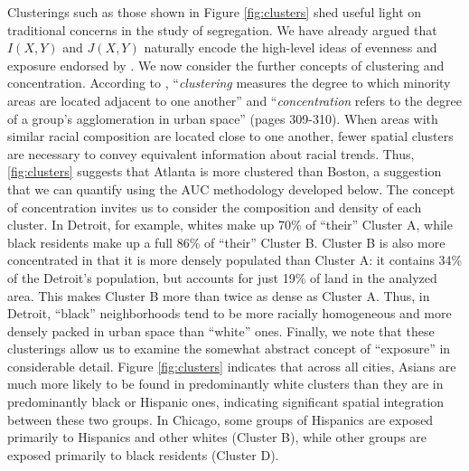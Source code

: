 	Clusterings such as those shown in Figure \ref{fig:clusters} shed useful light on traditional concerns in the study of segregation. We have already argued that $I(X,Y)$ and $J(X,Y)$ naturally encode the high-level ideas of evenness and exposure endorsed by \cite{Reardon2004}. We now consider the further concepts of clustering and concentration. According to \cite{Press2009a}, ``\emph{clustering} measures the degree to which minority areas are located adjacent to one another'' and ``\emph{concentration} refers to the degree of a group's agglomeration in urban space'' (pages 309-310). When areas with similar racial composition are located close to one another, fewer spatial clusters are necessary to convey equivalent information about racial trends. Thus, \ref{fig:clusters} suggests that Atlanta is more clustered than Boston, a suggestion that we can quantify using the AUC methodology developed below. The concept of concentration invites us to consider the composition and density of each cluster. In Detroit, for example, whites make up 70\% of ``their'' Cluster A, while black residents make up a full 86\% of ``their'' Cluster B. Cluster B is also more concentrated in that it is more densely populated than Cluster A: it contains 34\% of the Detroit's population, but accounts for just 19\% of land in the analyzed area. This makes Cluster B more than twice as dense as Cluster A. Thus, in Detroit, ``black'' neighborhoods tend to be more racially homogeneous and more densely packed in urban space than ``white'' ones. Finally, we note that these clusterings allow us to examine the somewhat abstract concept of ``exposure'' in considerable detail. Figure \ref{fig:clusters} indicates that across all cities, Asians are much more likely to be found in predominantly white clusters than they are in predominantly black or Hispanic ones, indicating significant spatial integration between these two groups. In Chicago, some groups of Hispanics are exposed primarily to Hispanics and other whites (Cluster B), while other groups are exposed primarily to black residents (Cluster D).

